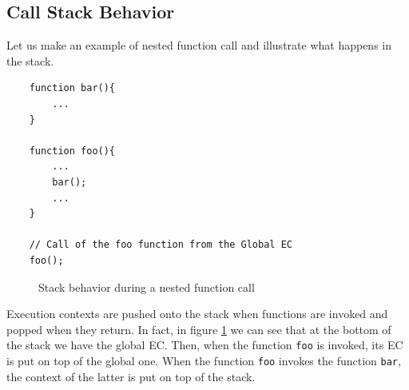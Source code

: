 \documentclass{scrbook}
\begin{document}
\subsection{Call Stack Behavior}

Let us make an example of nested function call and illustrate what happens in the stack.

\begin{lstlisting}
    function bar(){
        ...
    }

    function foo(){
        ...
        bar();
        ...
    }

    // Call of the foo function from the Global EC
    foo();
\end{lstlisting}

\begin{figure}
    \centering

    
    \caption{Stack behavior during a nested function call}
    \label{fig:stack_nested_call}
\end{figure}

Execution contexts are pushed onto the stack when functions are invoked and popped when they return. In fact, in figure \ref{fig:stack_nested_call} we can see that at the bottom of the stack we have the global EC. Then, when the function \texttt{foo} is invoked, its EC is put on top of the global one. When the function \texttt{foo} invokes the function \texttt{bar}, the context of the latter is put on top of the stack.
\end{document}
